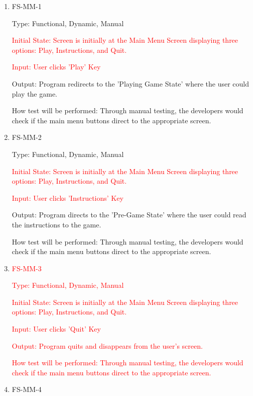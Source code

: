 \documentclass[12pt, titlepage]{article}
\begin{document}
\begin{enumerate}

\item{FS-MM-1\\}

Type: Functional, Dynamic, Manual
					
\textcolor{red}{Initial State: Screen is initially at the Main Menu Screen displaying three options: Play, Instructions, and Quit.}
					
\textcolor{red}{Input: User clicks 'Play' Key}
					
Output: Program redirects to the 'Playing Game State' where the user could play the game.
					
How test will be performed: Through manual testing, the developers would check if the main menu buttons direct to the appropriate screen.
					
\item{FS-MM-2\\}

Type: Functional, Dynamic, Manual
					
\textcolor{red}{Initial State: Screen is initially at the Main Menu Screen displaying three options: Play, Instructions, and Quit.}
					
\textcolor{red}{Input: User clicks 'Instructions' Key}
					
Output: Program directs to the 'Pre-Game State' where the user could read the instructions to the game.
					
How test will be performed: Through manual testing, the developers would check if the main menu buttons direct to the appropriate screen.

\item\textcolor{red}{FS-MM-3\\}

\textcolor{red}{Type: Functional, Dynamic, Manual}
					
\textcolor{red}{Initial State: Screen is initially at the Main Menu Screen displaying three options: Play, Instructions, and Quit. }
					
\textcolor{red}{Input: User clicks 'Quit' Key}
					
\textcolor{red}{Output: Program quits and disappears from the user's screen.}
					
\textcolor{red}{How test will be performed: Through manual testing, the developers would check if the main menu buttons direct to the appropriate screen.}

\item{FS-MM-4\\}


\end{enumerate}
\end{document}

